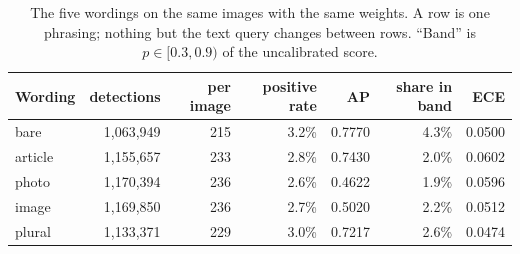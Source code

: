 \begin{table}[t]
\caption{The five wordings on the same images with the same weights. A row is one phrasing; nothing but the text query changes between rows. ``Band'' is $p\in[0.3,0.9)$ of the uncalibrated score.}
\label{tab:setup}
\begin{tabular*}{\textwidth}{@{\extracolsep{\fill}}lrrrrrr@{}}
\toprule
Wording & detections & per image & positive rate & AP & share in band & ECE \\
\midrule
bare               & 1{,}063{,}949 & 215 & 3.2\% & 0.7770 & 4.3\% & 0.0500 \\
article            & 1{,}155{,}657 & 233 & 2.8\% & 0.7430 & 2.0\% & 0.0602 \\
photo              & 1{,}170{,}394 & 236 & 2.6\% & 0.4622 & 1.9\% & 0.0596 \\
image              & 1{,}169{,}850 & 236 & 2.7\% & 0.5020 & 2.2\% & 0.0512 \\
plural             & 1{,}133{,}371 & 229 & 3.0\% & 0.7217 & 2.6\% & 0.0474 \\
\bottomrule
\end{tabular*}
\end{table}
